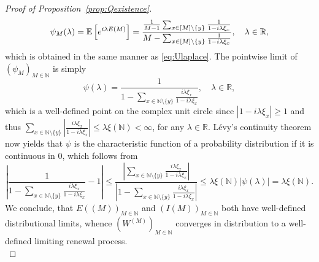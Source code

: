 \documentclass[11pt,a4paper]{scrartcl}
\numberwithin{equation}{section}
\theoremstyle{plain}
\theoremstyle{definition}
\theoremstyle{remark}
\newcommand{\bE}{\ensuremath{\mathbb{E}}}
\newcommand{\bN}{\ensuremath{\mathbb{N}}}
\newcommand{\bR}{\ensuremath{\mathbb{R}}}
\newcommand{\di}{\,\textup{d}}
\begin{document}
\begin{proof}[Proof of Proposition~\ref{prop:Qexistence}]
\[
\psi_M(\lambda)=\bE\left[\textup{e}^{i \lambda E(M)}\right]=\frac{\frac{1}{M-1}\sum_{x\in [M]\setminus\{y\}} \frac{1}{1-i\lambda \xi_x}}{ M-\sum_{x\in [M]\setminus\{y\}}\frac{1}{1-i\lambda \xi_x}},\quad \lambda\in\bR,
\]
which is obtained in the same manner as \eqref{eq:Ulaplace}. The pointwise limit of $(\psi_M)_{M\in\bN}$ is simply
\begin{equation}\label{eq:exccharf}
\psi(\lambda)=\frac{1}{1-\sum_{x\in \bN\setminus\{y\}} \frac{i\lambda \xi_x}{1-i\lambda \xi_x}},\quad \lambda\in\bR,
\end{equation}
which is a well-defined point on the complex unit circle since $|1-i\lambda \xi_x|\geq 1$ and thus $\sum_{x\in \bN\setminus\{y\}} \left|\frac{i\lambda \xi_x}{1-i\lambda \xi_x}\right|\leq \lambda \xi(\mathbb{N}) <\infty$, for any $\lambda\in\bR.$ L\'evy's continuity theorem now yields that $\psi$ is the characteristic function of a probability distribution if it is continuous in $0$, which follows from
\[
\left|\frac{1}{1-\sum_{x\in \bN\setminus\{y\}} \frac{i\lambda \xi_x}{1-i\lambda \xi_x}}-1\right|\leq \frac{\left|\sum_{x\in \bN\setminus\{y\}} \frac{i\lambda \xi_x}{1-i\lambda \xi_x}\right|}{\left|1-\sum_{x\in \bN\setminus\{y\}} \frac{i\lambda \xi_x}{1-i\lambda \xi_x}\right|}\leq \lambda \xi(\bN)|\psi(\lambda)|=\lambda \xi(\bN). 
\]
We conclude, that $E((M))_{M\in\bN}$ and $(I(M))_{M\in\bN}$ both have well-defined distributional limits, whence $(W^{(M)})_{M\in\bN}$ converges in distribution to a well-defined limiting renewal process.
\\

\end{proof}
\end{document}

